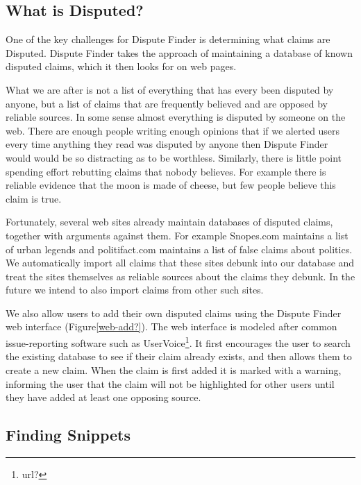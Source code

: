 \documentclass{www2010-submission}
\newcommand{\todo}[1]{}
\begin{document}
\todo{Cite Pew Research study saying people like to read news that supports their own point of view, but many others like neutral sources. http://people-press.org/report/?pageid=1353}


\subsection{What is Disputed?}

One of the key challenges for Dispute Finder is determining what claims are Disputed. Dispute Finder takes the approach of maintaining a database of known disputed claims, which it then looks for on web pages.

What we are after is not a list of everything that has every been disputed by anyone, but a list of claims that are frequently believed and are opposed by reliable sources. In some sense almost everything is disputed by someone on the web. There are enough people writing enough opinions that if we alerted users every time anything they read was disputed by anyone then Dispute Finder would would be so distracting as to be worthless. Similarly, there is little point spending effort rebutting claims that nobody believes. For example there is reliable evidence that the moon is made of cheese, but few people believe this claim is true.

Fortunately, several web sites already maintain databases of disputed claims, together with arguments against them. For example Snopes.com maintains a list of urban legends and politifact.com maintains a list of false claims about politics. We automatically import all claims that these sites debunk into our database and treat the sites themselves as reliable sources about the claims they debunk. In the future we intend to also import claims from other such sites.

We also allow users to add their own disputed claims using the Dispute Finder web interface (Figure\ref{web-add?}). The web interface is modeled after common issue-reporting software such as UserVoice\footnote{url?}. It first encourages the user to search the existing database to see if their claim already exists, and then allows them to create a new claim. When the claim is first added it is marked with a warning, informing the user that the claim will not be highlighted for other users until they have added at least one opposing source.

\todo{Actually import the Politifact data}

\subsection{Finding Snippets}
\end{document}

